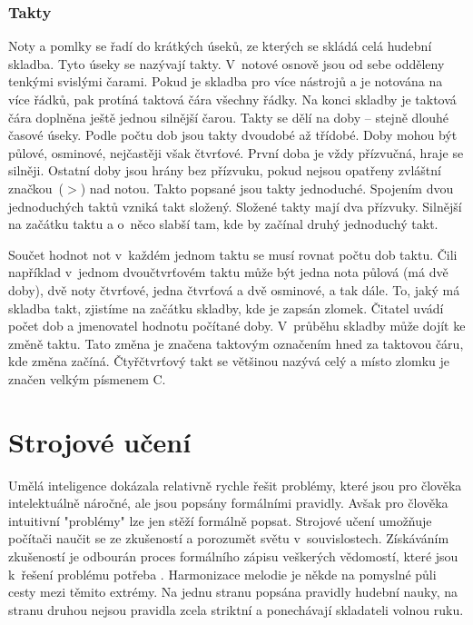 \subsection{Takty}
Noty a pomlky se řadí do krátkých úseků, 
ze kterých se skládá celá hudební skladba.
Tyto úseky se nazývají takty.
V~notové osnově jsou od sebe odděleny tenkými svislými čarami.
Pokud je skladba pro více nástrojů a je notována na více řádků, 
pak protíná taktová čára všechny řádky.
Na konci skladby je taktová čára doplněna ještě jednou silnější čarou. 
Takty se dělí na doby -- stejně dlouhé časové úseky.
Podle počtu dob jsou takty dvoudobé až třídobé.
Doby mohou být půlové, osminové, nejčastěji však čtvrťové.
První doba je vždy přízvučná, hraje se silněji.
Ostatní doby jsou hrány bez přízvuku, 
pokud nejsou opatřeny zvláštní značkou~($>$) nad notou.
Takto popsané jsou takty jednoduché.
Spojením dvou jednoduchých taktů vzniká takt složený.
Složené takty mají dva přízvuky.
Silnější na začátku taktu a o~něco slabší tam, 
kde by začínal druhý jednoduchý takt.
\par

Součet hodnot not v~každém jednom taktu se musí rovnat počtu dob taktu.
Čili například v~jednom  dvoučtvrťovém taktu 
může být jedna nota půlová (má dvě doby), 
dvě noty čtvrťové, jedna čtvrťová a dvě osminové, a tak dále.
To, jaký má skladba takt, zjistíme na začátku skladby, kde je zapsán zlomek.
Čitatel uvádí počet dob a jmenovatel hodnotu počítané doby.
V~průběhu skladby může dojít ke změně taktu.
Tato změna je značena taktovým označením hned za taktovou čáru, 
kde změna začíná.
Čtyřčtvrťový takt se většinou nazývá celý 
a místo zlomku je značen velkým písmenem C.
\cite{cmiral,zenkl}

\chapter{Strojové učení}
Umělá inteligence dokázala relativně rychle řešit problémy, 
které jsou pro člověka intelektuálně náročné, 
ale jsou popsány formálními pravidly.
Avšak pro člověka intuitivní "problémy" lze jen stěží formálně popsat.
Strojové učení umožňuje počítači naučit se ze zkušeností
a porozumět světu v~souvislostech.
Získáváním zkušeností je odbourán proces formálního zápisu veškerých vědomostí,
které jsou k~řešení problému potřeba
\cite{Goodfellow-et-al-2016}.
Harmonizace melodie je někde na pomyslné půli cesty mezi těmito extrémy.
Na jednu stranu popsána pravidly hudební nauky,
na stranu druhou nejsou pravidla zcela striktní 
a ponechávají skladateli volnou ruku.
\par

